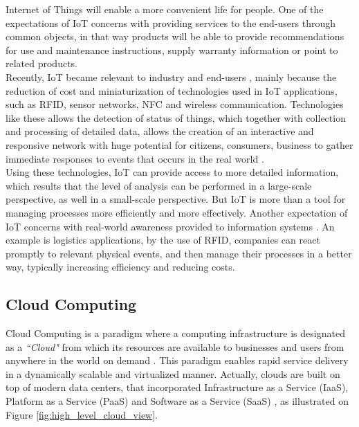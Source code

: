 Internet of Things will enable a more convenient life for people. One of the expectations
of IoT concerns with providing services to the end-users through common objects, in that way
products will be able to provide recommendations for use and maintenance instructions, supply warranty
information or point to related products.\\

Recently, IoT became relevant to industry and end-users \cite{Uckelmann:2011:AIT:2018904},
mainly because the reduction of cost and  miniaturization of technologies used in IoT applications,
such as RFID, sensor networks, NFC and  wireless communication. Technologies like these allows
the detection of status of things, which  together with collection and processing of detailed
data, allows the creation of an interactive  and responsive network with huge potential
for citizens, consumers, business to gather immediate responses to events that occurs
in the real world \cite{Uckelmann:2011:AIT:2018904}.\\

Using these technologies, IoT can provide access to more detailed information, which results
that the level of analysis can be performed in a large-scale perspective, as well in a
small-scale perspective. But IoT is more than a tool for managing processes more
efficiently and more effectively. Another expectation of IoT concerns with real-world
awareness provided to information systems \cite{mattern2010internet}. An example is logistics
applications, by the use of RFID, companies can react promptly to relevant physical events,
and then manage their processes in a better way, typically increasing efficiency and
reducing costs.
 
\subsection{Cloud Computing}
\label{sub:cloud_computing}
Cloud Computing is a paradigm where a computing infrastructure is designated as a \textit{``Cloud"}
from which its resources are available to businesses and users from anywhere in the
world on demand \cite{buyya2009cloud}. This paradigm enables rapid service delivery in
a dynamically scalable and virtualized manner. Actually, clouds are built on top of
modern data centers, that incorporated Infrastructure as a Service (IaaS), Platform as a Service (PaaS)
and Software as a Service (SaaS) \cite{tsai2010service}, as illustrated on Figure \ref{fig:high_level_cloud_view}.\\

